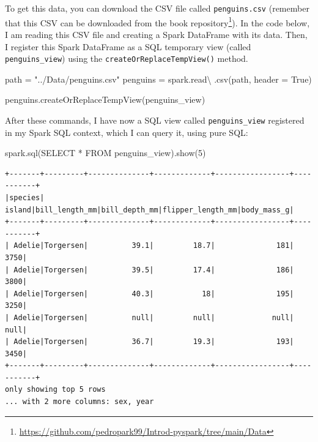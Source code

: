 \documentclass[
  11pt,
  letterpaper,
  DIV=11,
  numbers=noendperiod]{scrreprt}
\newenvironment{Shaded}{\begin{snugshade}}{\end{snugshade}}
\newcommand{\DecValTok}[1]{\textcolor[rgb]{0.68,0.00,0.00}{#1}}
\newcommand{\NormalTok}[1]{\textcolor[rgb]{0.00,0.23,0.31}{#1}}
\newcommand{\OperatorTok}[1]{\textcolor[rgb]{0.37,0.37,0.37}{#1}}
\newcommand{\StringTok}[1]{\textcolor[rgb]{0.13,0.47,0.30}{#1}}
\newcommand{\VariableTok}[1]{\textcolor[rgb]{0.07,0.07,0.07}{#1}}
\begin{document}
To get this data, you can download the CSV file called
\texttt{penguins.csv} (remember that this CSV can be downloaded from the
book repository\footnote{\url{https://github.com/pedropark99/Introd-pyspark/tree/main/Data}}).
In the code below, I am reading this CSV file and creating a Spark
DataFrame with its data. Then, I register this Spark DataFrame as a SQL
temporary view (called \texttt{penguins\_view}) using the
\texttt{createOrReplaceTempView()} method.

\begin{Shaded}
\begin{Highlighting}[]
\NormalTok{path }\OperatorTok{=} \StringTok{"../Data/penguins.csv"}
\NormalTok{penguins }\OperatorTok{=}\NormalTok{ spark.read}\OperatorTok{\textbackslash{}}
\NormalTok{  .csv(path, header }\OperatorTok{=} \VariableTok{True}\NormalTok{)}
  
\NormalTok{penguins.createOrReplaceTempView(}\StringTok{\textquotesingle{}penguins\_view\textquotesingle{}}\NormalTok{)}
\end{Highlighting}
\end{Shaded}

After these commands, I have now a SQL view called
\texttt{penguins\_view} registered in my Spark SQL context, which I can
query it, using pure SQL:

\begin{Shaded}
\begin{Highlighting}[]
\NormalTok{spark.sql(}\StringTok{\textquotesingle{}SELECT * FROM penguins\_view\textquotesingle{}}\NormalTok{).show(}\DecValTok{5}\NormalTok{)}
\end{Highlighting}
\end{Shaded}

\begin{verbatim}
+-------+---------+--------------+-------------+-----------------+-----------+
|species|   island|bill_length_mm|bill_depth_mm|flipper_length_mm|body_mass_g|
+-------+---------+--------------+-------------+-----------------+-----------+
| Adelie|Torgersen|          39.1|         18.7|              181|       3750|
| Adelie|Torgersen|          39.5|         17.4|              186|       3800|
| Adelie|Torgersen|          40.3|           18|              195|       3250|
| Adelie|Torgersen|          null|         null|             null|       null|
| Adelie|Torgersen|          36.7|         19.3|              193|       3450|
+-------+---------+--------------+-------------+-----------------+-----------+
only showing top 5 rows
... with 2 more columns: sex, year
\end{verbatim}
\end{document}
